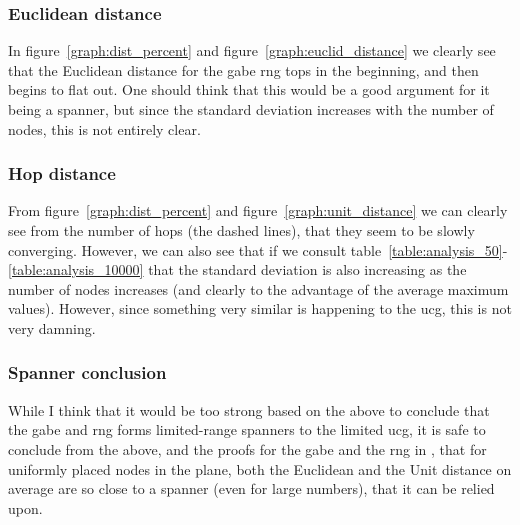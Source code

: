 \subsubsection{Euclidean distance}

In figure~\ref{graph:dist_percent} and figure~\ref{graph:euclid_distance} we clearly see that the Euclidean distance for the \ac{gabe} \ac{rng} tops in the beginning, and then begins to flat out. One should think that this would be a good argument for it being a spanner, but since the standard deviation increases with the number of nodes, this is not entirely clear.

\subsubsection{Hop distance}


From figure~\ref{graph:dist_percent} and figure~\ref{graph:unit_distance} we can clearly see from the number of hops (the dashed lines), that they seem to be slowly converging. However, we can also see that if we consult table~\ref{table:analysis_50}-\ref{table:analysis_10000} that the standard deviation is also increasing as the number of nodes increases (and clearly to the advantage of the average maximum values). However, since something very similar is happening to the \ac{ucg}, this is not very damning.

\subsubsection{Spanner conclusion}

While I think that it would be too strong based on the above to conclude that the \ac{gabe} and \ac{rng} forms limited-range spanners to the limited \ac{ucg}, it is safe to conclude from the above, and the proofs for the \ac{gabe} and the \ac{rng} in \cite{spanningGG_RNG}, that for uniformly placed nodes in the plane, both the Euclidean and the Unit distance on average are so close to a spanner (even for large numbers), that it can be relied upon. 

\subsection{}
